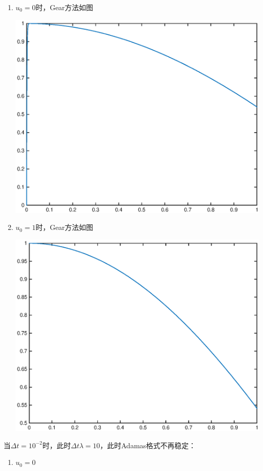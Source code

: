 \documentclass{ctexart}
\begin{document}
\begin{enumerate}
\begin{enumerate}
\begin{enumerate}
\item  \(u_0=0\)时，Gear方法如图


\centerline{\includegraphics[width=5.5in]{Gear0.eps}}


\item  \(u_0=1\)时，Gear方法如图

\centerline{\includegraphics[width=5.5in]{Gear1.eps}}

\end{enumerate}

当\(\Delta t = 10^{-2}\)时，此时\(\Delta t \lambda = 10\)，此时Adamas格式不再稳定：
\begin{enumerate}
\item \(u_0=0\)


\end{enumerate}
\end{enumerate}
\end{enumerate}
\end{document}
